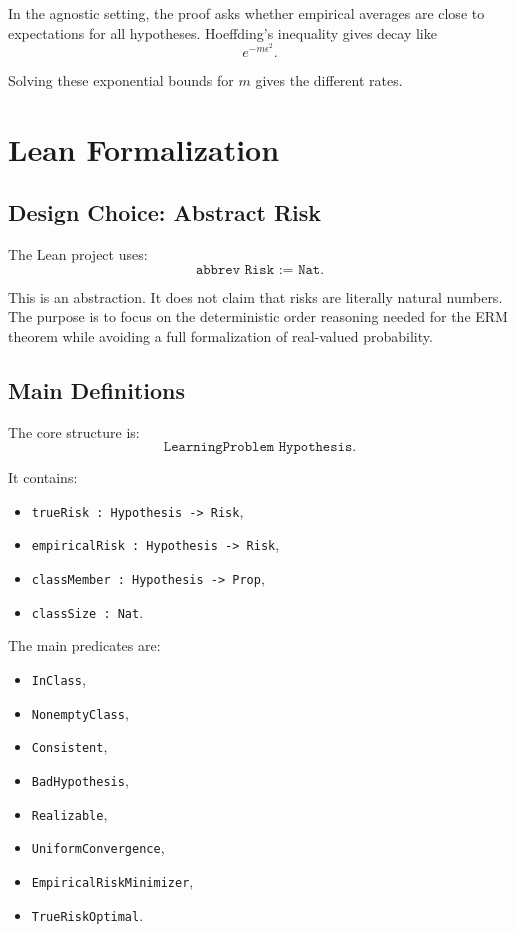 \documentclass[11pt]{article}
\newcommand{\eps}{\epsilon}
\theoremstyle{definition}
\begin{document}
In the agnostic setting, the proof asks whether empirical averages are close to
expectations for all hypotheses. Hoeffding's inequality gives decay like
\[
  e^{-m\eps^2}.
\]

Solving these exponential bounds for $m$ gives the different rates.

\section{Lean Formalization}

\subsection{Design Choice: Abstract Risk}

The Lean project uses:
\[
  \texttt{abbrev Risk := Nat}.
\]

This is an abstraction. It does not claim that risks are literally natural
numbers. The purpose is to focus on the deterministic order reasoning needed for
the ERM theorem while avoiding a full formalization of real-valued probability.

\subsection{Main Definitions}

The core structure is:
\[
  \texttt{LearningProblem Hypothesis}.
\]

It contains:
\begin{itemize}[leftmargin=*]
  \item \texttt{trueRisk : Hypothesis -> Risk},
  \item \texttt{empiricalRisk : Hypothesis -> Risk},
  \item \texttt{classMember : Hypothesis -> Prop},
  \item \texttt{classSize : Nat}.
\end{itemize}

The main predicates are:
\begin{itemize}[leftmargin=*]
  \item \texttt{InClass},
  \item \texttt{NonemptyClass},
  \item \texttt{Consistent},
  \item \texttt{BadHypothesis},
  \item \texttt{Realizable},
  \item \texttt{UniformConvergence},
  \item \texttt{EmpiricalRiskMinimizer},
  \item \texttt{TrueRiskOptimal}.
\end{itemize}
\end{document}
